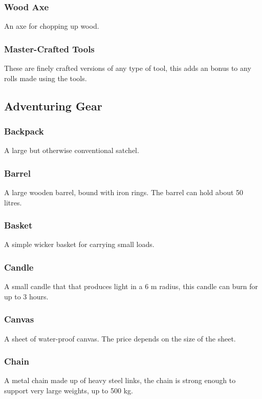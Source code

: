 \subsubsection*{Wood Axe}
An axe for chopping up wood.

\subsubsection*{Master-Crafted Tools}
These are finely crafted versions of any type of tool, this adds an  bonus to any rolls made using the tools.

\subsection{Adventuring Gear}

\subsubsection*{Backpack}
A large but otherwise conventional satchel.

\subsubsection*{Barrel}
A large wooden barrel, bound with iron rings. The barrel can hold about 50 litres.

\subsubsection*{Basket}
A simple wicker basket for carrying small loads.

\subsubsection*{Candle}
A small candle that that produces  light in a 6 m radius, this candle can burn for up to 3 hours.

\subsubsection*{Canvas}
A sheet of water-proof canvas. The price depends on the size of the sheet.

\subsubsection*{Chain}
A metal chain made up of heavy steel links, the chain is strong enough to support very large weights, up to 500 kg.

